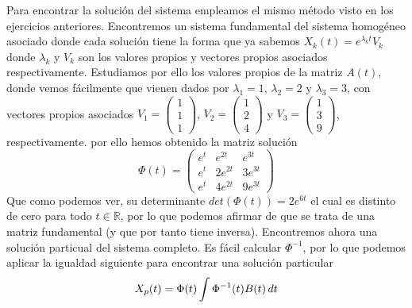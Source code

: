 \documentclass[fleqn]{article}
\def\R{\mathds{R}}
\begin{document}
    Para encontrar la solución del sistema empleamos el mismo método visto en los ejercicios anteriores. Encontremos un sistema fundamental del sistema homogéneo asociado donde cada solución tiene la forma que ya 
    sabemos $X_k(t) = e^{\lambda_k t}V_k$ donde $\lambda_k$ y $V_k$ son los valores propios y vectores propios asociados respectivamente. Estudiamos por ello los valores propios de la matriz $A(t)$,
    donde vemos fácilmente que vienen dados por $\lambda_1 = 1$, $\lambda_2 = 2$ y $\lambda_3 = 3$, con vectores propios asociados 
    $V_1=\begin{pmatrix} 1 \\ 1 \\ 1 \end{pmatrix}$, $V_2=\begin{pmatrix} 1 \\ 2 \\ 4 \end{pmatrix}$ y $V_3=\begin{pmatrix} 1 \\ 3 \\ 9 \end{pmatrix}$, respectivamente. por ello hemos obtenido la matriz solución
    $$
    \Phi(t)=
    \begin{pmatrix}
        e^t & e^{2t} & e^{3t} \\
        e^t & 2e^{2t} & 3e^{3t} \\ 
        e^t & 4e^{2t} & 9e^{3t}
    \end{pmatrix}
    $$
    Que como podemos ver, su determinante $det(\Phi(t))=2e^{6t}$ el cual es distinto de cero para todo $t\in\R$, por lo que podemos afirmar de que se trata de una matriz fundamental
    (y que por tanto tiene inversa). Encontremos ahora una solución particual del sistema completo. Es fácil calcular $\Phi^{-1}$, por lo que podemos aplicar la igualdad siguiente para
    encontrar una solución particular
    $$X_p(t) = \Phi(t) \int \Phi^{-1}(t)B(t) \thinspace dt$$
\end{document}
